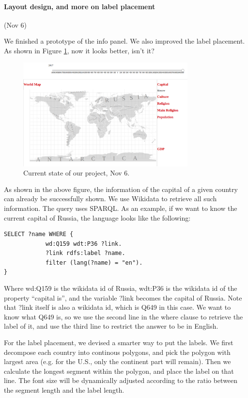\documentclass[12pt, fullpage,letterpaper]{article}
\begin{document}
\paragraph{Layout design, and more on label placement} (Nov 6)

We finished a prototype of the info panel. We also improved the label placement.
As shown in Figure \ref{fig:nov6}, now it looks better, isn't it?

\begin{figure}[h!]
    \begin{center}
        \includegraphics[width=0.8\textwidth]{figs/Nov6.png}
        \caption{Current state of our project, Nov 6.}
        \label{fig:nov6}
    \end{center}
\end{figure}

As shown in the above figure, the information of the capital of a given country
can already be successfully shown. We use Wikidata to retrieve all such information.
The query uses SPARQL. As an example, if we want to know the current capital of Russia,
the language looks like the following:

\begin{verbatim}
SELECT ?name WHERE {
            wd:Q159 wdt:P36 ?link.
            ?link rdfs:label ?name.
            filter (lang(?name) = "en").
}
\end{verbatim}

Where wd:Q159 is the wikidata id of Russia, wdt:P36 is the wikidata id of the property ``capital is'',
and the variable ?link becomes the capital of Russia. Note that ?link itself is also a wikidata id,
which is Q649 in this case. We want to know what Q649 is, so we use the second line in the where clause to retrieve
the label of it, and use the third line to restrict the answer to be in English.

For the label placement, we devised a smarter way to put the labels. We first decompose
each country into continous polygons, and pick the polygon with largest area (e.g. for the U.S., only the continent part will remain).
Then we calculate the longest segment within the polygon, and place the label on that line.
The font size will be dynamically adjusted according to the ratio between the segment length and the label length.
\end{document}
